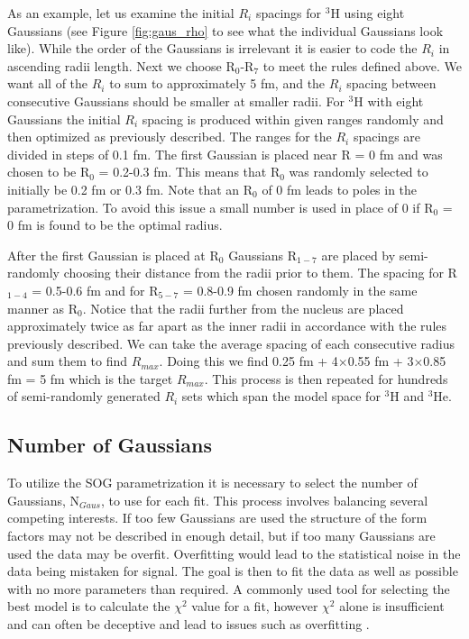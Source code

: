 As an example, let us examine the initial $R_i$ spacings for $^3$H using eight Gaussians (see Figure \ref{fig:gaus_rho} to see what the individual Gaussians look like). While the order of the Gaussians is irrelevant it is easier to code the $R_i$ in ascending radii length. Next we choose R$_0$-R$_7$ to meet the rules defined above. We want all of the $R_i$ to sum to approximately 5 fm, and the $R_i$ spacing between consecutive Gaussians should be smaller at smaller radii. For $^3$H with eight Gaussians the initial $R_i$ spacing is produced within given ranges randomly and then optimized as previously described. The ranges for the $R_i$ spacings are divided in steps of 0.1 fm. The first Gaussian is placed near R = 0 fm and was chosen to be R$_0$ = 0.2-0.3 fm. This means that R$_0$ was randomly selected to initially be 0.2 fm or 0.3 fm. Note that an R$_0$ of 0 fm leads to poles in the parametrization. To avoid this issue a small number is used in place of 0 if R$_0$ = 0 fm is found to be the optimal radius. 

After the first Gaussian is placed at R$_0$ Gaussians R$_{1-7}$ are placed by semi-randomly choosing their distance from the radii prior to them. The spacing for R$_{1-4}$ = 0.5-0.6 fm and for R$_{5-7}$ = 0.8-0.9 fm chosen randomly in the same manner as R$_0$. Notice that the radii further from the nucleus are placed approximately twice as far apart as the inner radii in accordance with the rules previously described. We can take the average spacing of each consecutive radius and sum them to find $R_{max}$. Doing this we find 0.25 fm + 4$\times$0.55 fm + 3$\times$0.85 fm = 5 fm which is the target $R_{max}$. This process is then repeated for hundreds of semi-randomly generated $R_i$ sets which span the model space for $^3$H and $^3$He. 

\subsection{Number of Gaussians}
\label{ssec:ngaus}

To utilize the SOG parametrization it is necessary to select the number of Gaussians, N$_{Gaus}$, to use for each fit. This process involves balancing several competing interests. If too few Gaussians are used the structure of the form factors may not be described in enough detail, but if too many Gaussians are used the data may be overfit. Overfitting would lead to the statistical noise in the data being mistaken for signal. The goal is then to fit the data as well as possible with no more parameters than required. A commonly used tool for selecting the best model is to calculate the $\chi^2$ value for a fit, however $\chi^2$ alone is insufficient and can often be deceptive and lead to issues such as overfitting \cite{doug_stats}. 

